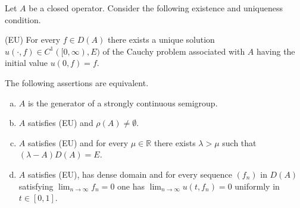 \begin{corollary}\label{cor:1.2}
Let $A$ be a closed operator.
Consider the following existence and uniqueness condition.

(EU) For every $f \in D(A)$ there exists a unique solution $u(\cdot,f)\in C^{1}([0,\infty),E)$ of the Cauchy problem associated with $A$ having the initial value $u(0,f) = f$.

The following assertions are equivalent.
\begin{enumerate}[(a)]
\item $A$ is the generator of a strongly continuous semigroup.
\item $A$ satisfies (EU) and $\rho(A) \neq \emptyset$.
\item $A$ satisfies (EU) and for every $\mu \in \mathbb{R}$ there exists $\lambda > \mu$ such that $(\lambda-A)D(A) = E$.
\item $A$ satisfies (EU), has dense domain and for every sequence $(f_{n})$ in $D(A)$ satisfying $\lim_{n \to \infty}f_{n} = 0$ one has $\lim_{n \to \infty}u(t,f_{n}) = 0$ uniformly in $t \in [0,1]$.
\end{enumerate}
\end{corollary}

